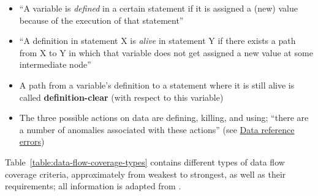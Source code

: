 \begin{itemize}
    \item ``A variable is \emph{defined} in a certain statement if it is
          assigned a (new) value because of the execution of that
          statement'' \citep[p.~424]{vanVliet2000}
    \item ``A definition in statement X is \emph{alive} in statement Y if
          there exists a path from X to Y in which that variable does not
          get assigned a new value at some intermediate node''
          \citep[p.~424]{vanVliet2000}
    \item A path from a variable's definition to a statement where it is
          still alive is called \textbf{definition-clear} (with respect to
          this variable) \citep[p.~424]{vanVliet2000}
    \item The three possible actions on data are defining, killing, and using;
          ``there are a number of anomalies associated with these actions''
          \citep[pp.~478,~480]{PetersAndPedrycz2000}
          (see \hyperref[data-ref-errors]{Data reference errors})
\end{itemize}

Table~\ref{table:data-flow-coverage-types} contains different types of data
flow coverage criteria, approximately from weakest to strongest, as well as
their requirements; all information is adapted from
\citep[pp.~424-425]{vanVliet2000} .


